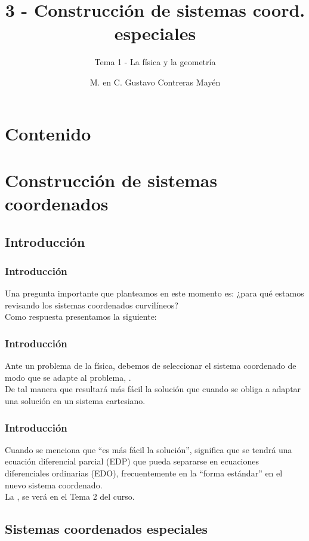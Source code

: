 \documentclass[12pt]{beamer}
\title{\large{3 - Construcción de sistemas coord. especiales}}
\subtitle{Tema 1 - La física y la geometría}
\author{M. en C. Gustavo Contreras Mayén}
\date{}
\begin{document}
\maketitle
\fontsize{14}{14}\selectfont
{}

\section*{Contenido}

\section{Construcción de sistemas coordenados}
\subsection{Introducción}

\begin{frame}
\frametitle{Introducción}
Una pregunta importante que planteamos en este momento es: ¿para qué estamos revisando los sistemas coordenados curvilíneos?
\\
\bigskip
\pause
Como respuesta presentamos la siguiente:
\end{frame}
\begin{frame}
\frametitle{Introducción}
Ante un problema de la física, debemos de seleccionar el sistema coordenado de modo que se adapte al problema, .
\\
\bigskip
\pause
De tal manera que resultará más fácil la solución que cuando se obliga a adaptar una solución en un sistema cartesiano.
\end{frame}
\begin{frame}
\frametitle{Introducción}
Cuando se menciona que \enquote{es más fácil la solución}, significa que se tendrá una ecuación diferencial parcial (EDP) que pueda separarse en ecuaciones diferenciales ordinarias (EDO), frecuentemente en la \enquote{forma estándar} en el nuevo sistema coordenado.
\\
\bigskip
\pause
La , se verá en el Tema 2 del curso.
\end{frame}

\subsection{Sistemas coordenados especiales}
\end{document}
